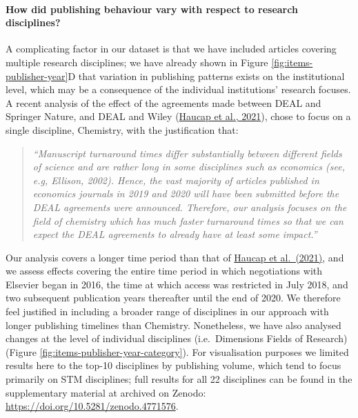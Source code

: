 \documentclass[
]{article}
\begin{document}
\hypertarget{how-did-publishing-behaviour-vary-with-respect-to-research-disciplines}{%
\paragraph{How did publishing behaviour vary with respect to research disciplines?}\label{how-did-publishing-behaviour-vary-with-respect-to-research-disciplines}}

A complicating factor in our dataset is that we have included articles covering multiple research disciplines; we have already shown in Figure \ref{fig:items-publisher-year}D that variation in publishing patterns exists on the institutional level, which may be a consequence of the individual institutions' research focuses. A recent analysis of the effect of the agreements made between DEAL and Springer Nature, and DEAL and Wiley (\href{https://www.cesifo.org/en/publikationen/2021/working-paper/impact-german-deal-competition-academic-publishing-market}{Haucap et al., 2021}), chose to focus on a single discipline, Chemistry, with the justification that:

\begin{quote}
\emph{``Manuscript turnaround times differ substantially between different fields of science and are rather long in some disciplines such as economics (see, e.g, Ellison, 2002). Hence, the vast majority of articles published in economics journals in 2019 and 2020 will have been submitted before the DEAL agreements were announced. Therefore, our analysis focuses on the field of chemistry which has much faster turnaround times so that we can expect the DEAL agreements to already have at least some impact.''}
\end{quote}

Our analysis covers a longer time period than that of \href{https://www.cesifo.org/en/publikationen/2021/working-paper/impact-german-deal-competition-academic-publishing-market}{Haucap et al.~(2021)}, and we assess effects covering the entire time period in which negotiations with Elsevier began in 2016, the time at which access was restricted in July 2018, and two subsequent publication years thereafter until the end of 2020. We therefore feel justified in including a broader range of disciplines in our approach with longer publishing timelines than Chemistry. Nonetheless, we have also analysed changes at the level of individual disciplines (i.e.~Dimensions Fields of Research) (Figure \ref{fig:items-publisher-year-category}). For visualisation purposes we limited results here to the top-10 disciplines by publishing volume, which tend to focus primarily on STM disciplines; full results for all 22 disciplines can be found in the supplementary material at archived on Zenodo: \url{https://doi.org/10.5281/zenodo.4771576}.
\end{document}
